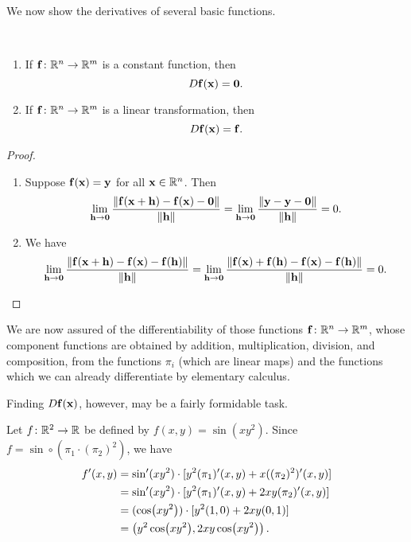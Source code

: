 We now show the derivatives of several basic functions.

\begin{lemma} \
\begin{enumerate}[label=(\roman*)]
\item If $\vb{f}\colon\mathbb R^n\to\mathbb R^m$ is a constant function, then
\[D\vb{f}(\vb{x})=\vb{0}.\]
\item If $\vb{f}\colon\mathbb R^n\to\mathbb R^m$ is a linear transformation, then
\[D\vb{f}(\vb{x})=\vb{f}.\]
\end{enumerate}
\end{lemma}

\begin{proof} \
\begin{enumerate}[label=(\roman*)]
\item Suppose $\vb{f}(\vb{x})=\vb{y}$ for all $\vb{x}\in\mathbb R^n$. Then
\[\lim_{\vb{h}\to\vb{0}}\frac{\norm{\vb{f}(\vb{x}+\vb{h})-\vb{f}(\vb{x})-\vb{0}}}{\norm{\vb{h}}}=\lim_{\vb{h}\to\vb{0}}\frac{\norm{\vb{y}-\vb{y}-\vb{0}}}{\norm{\vb{h}}}=0.\]

\item We have
\[\lim_{\vb{h}\to\vb{0}}\frac{\norm{\vb{f}(\vb{x}+\vb{h})-\vb{f}(\vb{x})-\vb{f}(\vb{h})}}{\norm{\vb{h}}}
=\lim_{\vb{h}\to\vb{0}}\frac{\norm{\vb{f}(\vb{x})+\vb{f}(\vb{h})-\vb{f}(\vb{x})-\vb{f}(\vb{h})}}{\norm{\vb{h}}}=0.\]
\end{enumerate}
\end{proof}

We are now assured of the differentiability of those functions $\vb{f}\colon\mathbb R^n\to\mathbb R^m$, whose component functions are obtained by addition, multiplication, division, and composition, from the functions $\pi_i$ (which are linear maps) and the functions which we can already differentiate by elementary calculus.

Finding $D\vb{f}(\vb{x})$, however, may be a fairly formidable task.

\begin{example}
Let $f\colon\mathbb R^2\to\mathbb R$ be defined by $f(x,y)=\sin(xy^2)$. Since $f=\sin\circ(\pi_1\cdot(\pi_2)^2)$, we have
\begin{align*}
f^\prime(x,y)&=\sin^\prime(xy^2)\cdot[y^2(\pi_1)^\prime(x,y)+x((\pi_2)^2)^\prime(x,y)]\\
&=\sin^\prime(xy^2)\cdot[y^2(\pi_1)^\prime(x,y)+2xy(\pi_2)^\prime(x,y)]\\
&=(\cos(xy^2))\cdot[y^2(1,0)+2xy(0,1)]\\
&=\left(y^2\cos(xy^2),2xy\cos(xy^2)\right).
\end{align*}
\end{example}

